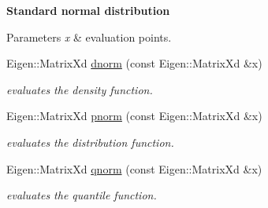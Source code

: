 \begin{Indent}{\bf Standard normal distribution}\par
{\em 
\begin{DoxyParams}{Parameters}
{\em x} & evaluation points. \\
\hline
\end{DoxyParams}
}\begin{DoxyCompactItemize}
\item 
Eigen\+::\+Matrix\+Xd \hyperlink{namespacetools__stats_a6cccc042aa52752b71bc26aa75eb5e96}{dnorm} (const Eigen\+::\+Matrix\+Xd \&x)\hypertarget{namespacetools__stats_a6cccc042aa52752b71bc26aa75eb5e96}{}\label{namespacetools__stats_a6cccc042aa52752b71bc26aa75eb5e96}

\begin{DoxyCompactList}\small\item\em evaluates the density function. \end{DoxyCompactList}\item 
Eigen\+::\+Matrix\+Xd \hyperlink{namespacetools__stats_af3b2c7c267f78fbc8c3de26ef959a58f}{pnorm} (const Eigen\+::\+Matrix\+Xd \&x)\hypertarget{namespacetools__stats_af3b2c7c267f78fbc8c3de26ef959a58f}{}\label{namespacetools__stats_af3b2c7c267f78fbc8c3de26ef959a58f}

\begin{DoxyCompactList}\small\item\em evaluates the distribution function. \end{DoxyCompactList}\item 
Eigen\+::\+Matrix\+Xd \hyperlink{namespacetools__stats_acc57d04fffc7a8d39a60fa5e2292cb99}{qnorm} (const Eigen\+::\+Matrix\+Xd \&x)\hypertarget{namespacetools__stats_acc57d04fffc7a8d39a60fa5e2292cb99}{}\label{namespacetools__stats_acc57d04fffc7a8d39a60fa5e2292cb99}

\begin{DoxyCompactList}\small\item\em evaluates the quantile function. \end{DoxyCompactList}\end{DoxyCompactItemize}
\end{Indent}

